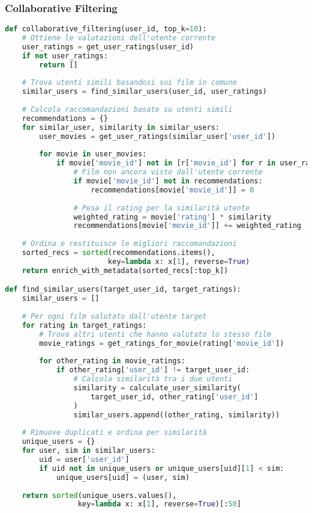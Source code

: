 \documentclass[11pt,a4paper]{article}
\begin{document}
\subsubsection{Collaborative Filtering}
\begin{lstlisting}[language=Python, caption=Algoritmo Collaborative Filtering]
def collaborative_filtering(user_id, top_k=10):
    # Ottiene le valutazioni dell'utente corrente
    user_ratings = get_user_ratings(user_id)
    if not user_ratings:
        return []
    
    # Trova utenti simili basandosi sui film in comune
    similar_users = find_similar_users(user_id, user_ratings)
    
    # Calcola raccomandazioni basate su utenti simili
    recommendations = {}
    for similar_user, similarity in similar_users:
        user_movies = get_user_ratings(similar_user['user_id'])
        
        for movie in user_movies:
            if movie['movie_id'] not in [r['movie_id'] for r in user_ratings]:
                # Film non ancora visto dall'utente corrente
                if movie['movie_id'] not in recommendations:
                    recommendations[movie['movie_id']] = 0
                
                # Pesa il rating per la similarità utente
                weighted_rating = movie['rating'] * similarity
                recommendations[movie['movie_id']] += weighted_rating
    
    # Ordina e restituisce le migliori raccomandazioni
    sorted_recs = sorted(recommendations.items(), 
                        key=lambda x: x[1], reverse=True)
    return enrich_with_metadata(sorted_recs[:top_k])

def find_similar_users(target_user_id, target_ratings):
    similar_users = []
    
    # Per ogni film valutato dall'utente target
    for rating in target_ratings:
        # Trova altri utenti che hanno valutato lo stesso film
        movie_ratings = get_ratings_for_movie(rating['movie_id'])
        
        for other_rating in movie_ratings:
            if other_rating['user_id'] != target_user_id:
                # Calcola similarità tra i due utenti
                similarity = calculate_user_similarity(
                    target_user_id, other_rating['user_id']
                )
                similar_users.append((other_rating, similarity))
    
    # Rimuove duplicati e ordina per similarità
    unique_users = {}
    for user, sim in similar_users:
        uid = user['user_id']
        if uid not in unique_users or unique_users[uid][1] < sim:
            unique_users[uid] = (user, sim)
    
    return sorted(unique_users.values(), 
                 key=lambda x: x[1], reverse=True)[:50]
\end{lstlisting}
\end{document}
